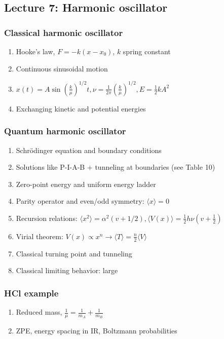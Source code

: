 \documentclass[11pt]{article}
\begin{document}
\subsection{Lecture 7: Harmonic oscillator}
\label{sec:orgaf93810}
\subsubsection{Classical harmonic oscillator}
\label{sec:org8641b36}
\begin{enumerate}
\item Hooke's law, \(F=-k(x-x_0)\), \(k\) spring constant
\item Continuous sinusoidal motion
\item \(x(t)=A \sin(\frac{k}{\mu})^{1/2}t, \nu=\frac{1}{2\pi}(\frac{k}{\mu})^{1/2}, E=\frac{1}{2}kA^2\)
\item Exchanging kinetic and potential energies
\end{enumerate}
\subsubsection{Quantum harmonic oscillator}
\label{sec:orgc571c1f}
\begin{enumerate}
\item Schr\"{o}dinger equation and boundary conditions
\item Solutions like P-I-A-B + tunneling at boundaries (see Table 10)
\item Zero-point energy and uniform energy ladder
\item Parity operator and even/odd symmetry:  \(\langle x \rangle =0\)
\item Recursion relations: \(\langle x^2 \rangle =
      \alpha^2 (v+1/2), \langle V(x) \rangle = \frac{1}{2} h\nu (v+\frac{1}{2})\)
\item Virial theorem: \(V(x) \propto x^n \rightarrow \langle T \rangle = \frac{n}{2}\langle V \rangle\)
\item Classical turning point and tunneling
\item Classical limiting behavior: large
\end{enumerate}
\subsubsection{HCl example}
\label{sec:org5b502b0}
\begin{enumerate}
\item Reduced mass, \(\frac{1}{\mu}=\frac{1}{m_A}+\frac{1}{m_B}\)
\item ZPE, energy spacing in IR, Boltzmann probabilities
\end{enumerate}
\end{document}
